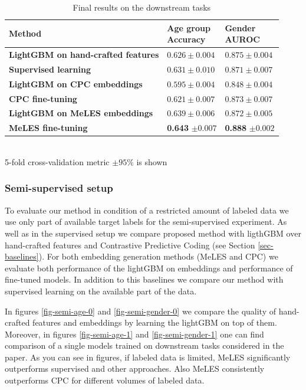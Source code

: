 \documentclass{article}
\begin{document}
\begin{table}
\centering
\caption{Final results on the downstream tasks}
\begin{tabular}{lll}
\toprule
\textbf{Method} & \makecell{\textbf{Age group} \\ \small{Accuracy}} & \makecell{\textbf{Gender} \\ \small{AUROC}} \\
\midrule
\textbf{LightGBM on hand-crafted features} & $0.626 \pm 0.004$ & $0.875 \pm 0.004$ \\
\textbf{Supervised learning} & $0.631 \pm 0.010$ & $0.871 \pm 0.007$ \\
\midrule
\textbf{LightGBM on CPC embeddings} & $0.595 \pm 0.004$ & $0.848 \pm 0.004$ \\
\textbf{CPC fine-tuning} & $0.621 \pm 0.007$ & $0.873 \pm 0.007$  \\
\midrule
\textbf{LightGBM on MeLES embeddings} & $0.639 \pm 0.006$ & $0.872 \pm 0.005$ \\
\textbf{MeLES fine-tuning} & \textbf{0.643} $\pm 0.007$ & \textbf{0.888} $\pm 0.002$  \\
\bottomrule
\end{tabular} \\
\small{5-fold cross-validation metric $\pm 95\%$ is shown}
\label{tab-downstream-res}
\end{table}

\subsubsection{Semi-supervised setup} \label{sec-semi}

To evaluate our method in condition of a restricted amount of labeled data we use only part of available target labels for the semi-supervised experiment.
As well as in the supervised setup we compare proposed method with ligthGBM over hand-crafted features and Contrastive Predictive Coding (see Section \ref{sec-baselines}).
For both embedding generation methods (MeLES and CPC) we evaluate both performance of the lightGBM on embeddings and performance of fine-tuned models.
In addition to this baselines we compare our method with supervised learning on the available part of the data.

In figures \ref{fig-semi-age-0} and \ref{fig-semi-gender-0} we compare the quality of hand-crafted features and embeddings by learning the lightGBM on top of them. Moreover, in figures \ref{fig-semi-age-1} and \ref{fig-semi-gender-1} one can find comparison of a single models trained on downstream tasks considered in the paper. As you can see in figures, if labeled data is limited, MeLES significantly outperforms supervised and other approaches. Also MeLES consistently outperforms CPC for different volumes of labeled data.
\end{document}
